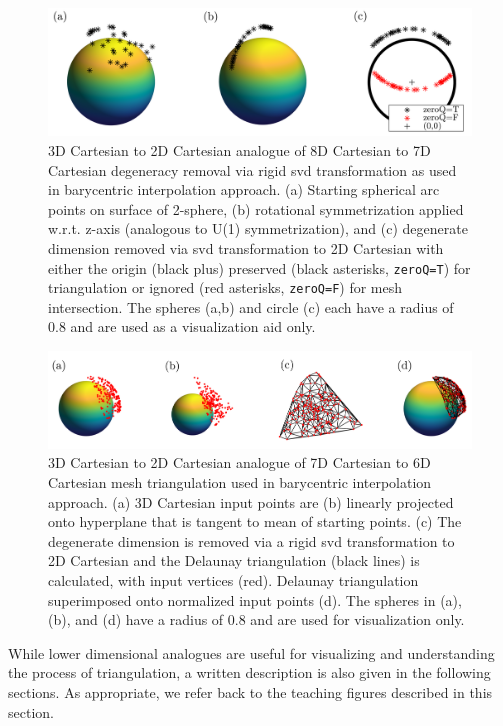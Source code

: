 \documentclass[final,twocolumn,12pt]{elsarticle}
\newcommand{\matlab}[1]{\mbox{\lstinline[style=Matlab-editor]{#1}}}
\newcommand{\inpt}{input}
\begin{document}
\begin{appendices}
\begin{figure}
    \centering
    \includegraphics[scale=1]{bary-remove-deg.png}
    \caption{3D Cartesian to 2D Cartesian analogue of 8D Cartesian to 7D Cartesian degeneracy removal via rigid \gls{svd} transformation as used in barycentric interpolation approach. (a) Starting spherical arc points on surface of 2-sphere, (b) rotational symmetrization applied w.r.t. z-axis (analogous to U(1) symmetrization), and (c) degenerate dimension removed via \acrlong{svd} transformation to 2D Cartesian with either the origin (black plus) preserved (black asterisks, \matlab{zeroQ=T}) for triangulation or ignored (red asterisks, \matlab{zeroQ=F}) for mesh intersection. The spheres (a,b) and circle (c) each have a radius of 0.8 and are used as a visualization aid only.}
    \label{fig:bary-remove-deg}
\end{figure}

\begin{figure}
    \centering
    \includegraphics[scale=1]{bary-delaunay.png}
    \caption{3D Cartesian to 2D Cartesian analogue of 7D Cartesian to 6D Cartesian mesh triangulation used in barycentric interpolation approach. (a) 3D Cartesian \inpt{} points are (b) linearly projected onto hyperplane that is tangent to mean of starting points. (c) The degenerate dimension is removed via a rigid \gls{svd} transformation to 2D Cartesian and the Delaunay triangulation (black lines) is calculated, with \inpt{} vertices (red). Delaunay triangulation superimposed onto normalized \inpt{} points (d). The spheres in (a), (b), and (d) have a radius of 0.8 and are used for visualization only.}
    \label{fig:bary-delaunay}
\end{figure}

While lower dimensional analogues are useful for visualizing and understanding the process of triangulation, a written description is also given in the following sections. As appropriate, we refer back to the teaching figures described in this section.


\end{appendices}
\end{document}
